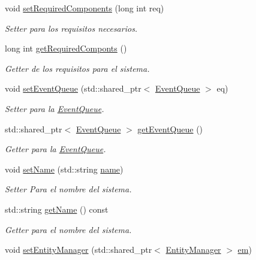 \begin{DoxyCompactItemize}
\item 
void \hyperlink{classant_1_1_system_a35662ff3739ff4290df1106bfdccfaca}{set\+Required\+Components} (long int req)
\begin{DoxyCompactList}\small\item\em Setter para los requisitos necesarios. \end{DoxyCompactList}\item 
long int \hyperlink{classant_1_1_system_a2d94338969f43d4fd2fd972deb099258}{get\+Required\+Componts} ()
\begin{DoxyCompactList}\small\item\em Getter de los requisitos para el sistema. \end{DoxyCompactList}\item 
void \hyperlink{classant_1_1_system_a1effe9f0e5615e516a34be02d5895434}{set\+Event\+Queue} (std\+::shared\+\_\+ptr$<$ \hyperlink{classant_1_1_event_queue}{Event\+Queue} $>$ eq)
\begin{DoxyCompactList}\small\item\em Setter para la \hyperlink{classant_1_1_event_queue}{Event\+Queue}. \end{DoxyCompactList}\item 
std\+::shared\+\_\+ptr$<$ \hyperlink{classant_1_1_event_queue}{Event\+Queue} $>$ \hyperlink{classant_1_1_system_ac3e2bbbdb622276d194ad3a687d8e4f1}{get\+Event\+Queue} ()
\begin{DoxyCompactList}\small\item\em Getter para la \hyperlink{classant_1_1_event_queue}{Event\+Queue}. \end{DoxyCompactList}\item 
void \hyperlink{classant_1_1_system_a231f9fc93b55ee67deb9597ae6be13ba}{set\+Name} (std\+::string \hyperlink{classant_1_1_system_a60b3c00a760a3b4947ab1f1fc534a5b2}{name})
\begin{DoxyCompactList}\small\item\em Setter Para el nombre del sistema. \end{DoxyCompactList}\item 
std\+::string \hyperlink{classant_1_1_system_a52a559b2c3ddbec5c846df1badd7f7f8}{get\+Name} () const 
\begin{DoxyCompactList}\small\item\em Getter para el nombre del sistema. \end{DoxyCompactList}\item 
void \hyperlink{classant_1_1_system_a1f983382d142ea697f1811f7f6f6ab17}{set\+Entity\+Manager} (std\+::shared\+\_\+ptr$<$ \hyperlink{classant_1_1_entity_manager}{Entity\+Manager} $>$ \hyperlink{classant_1_1_system_a5661d872ff769be150bd4e9a9552f6b9}{em})

\end{DoxyCompactItemize}

